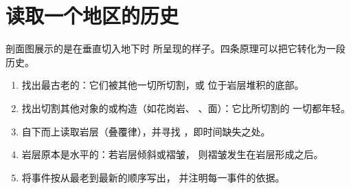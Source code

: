 \section{读取一个地区的历史}

剖面图展示的是在垂直切入地下时
所呈现的样子。四条原理可以把它转化为一段历史。

\begin{method}[按顺序排列剖面图中的事件]\label{met:g7:geological-time:ordering}
\begin{enumerate}
  \item 找出最古老的：它们被其他一切所切割，或
        位于岩层堆积的底部。
  \item 找出切割其他对象的或构造（如花岗岩、
        、面）：它比所切割的
        一切都年轻。
  \item 自下而上读取岩层（叠覆律），并寻找
        ，即时间缺失之处。
  \item 岩层原本是水平的：若岩层倾斜或褶皱，
        则褶皱发生在岩层形成之后。
  \item 将事件按从最老到最新的顺序写出，
        并注明每一事件的依据。
\end{enumerate}
\end{method}

